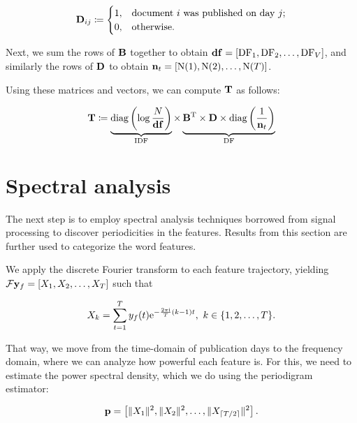\begin{equation}
	\mathbf{D}_{ij} \coloneqq
	\begin{cases}
		1, & \text{document}~i~\text{was published on day}~j \text{;} \\
		0, & \text{otherwise}.
	\end{cases}
\end{equation}

Next, we sum the rows of $\mathbf{B}$ together to obtain $\vect{\df} = \left[ \text{\df}_{1}, \text{\df}_{2}, \dots, \text{\df}_{\featcount} \right]$, and similarly the rows of $\mathbf{D}$ to obtain $\vect{\doccount}_{t} = \left[ \text{\doccount}(1), \text{\doccount}(2), \dots, \text{\doccount}(\streamlen) \right]$.

Using these matrices and vectors, we can compute $\mathbf{T}$ as follows:

\begin{equation}
	\trajmat \coloneqq
		\underbrace{\text{diag} \left( \log{\frac{\doccount}{\vect{\df}}} \right)}_{\text{IDF}}
		\times
		\underbrace{\bowmat^{\T}
		\times \dtdmat
		\times \text{diag} \left( \frac{1}{\vect{\doccount}_{t}} \right)}_{\text{DF}}
\end{equation}


\section{Spectral analysis}
The next step is to employ spectral analysis techniques borrowed from signal processing to discover periodicities in the features. Results from this section are further used to categorize the word features.

We apply the discrete Fourier transform to each feature trajectory, yielding $\mathcal{F} \vect{\traj}_{f} = \left[ X_{1}, X_{2}, \dots, X_{\streamlen}\right ]$ such that

\begin{equation*}
	X_{k} = \sum_{t = 1}^{T}{y_{f}(t) \mathrm{e}^{- \frac{2 \pi \mathrm{i}}{T} (k - 1) t}}, ~ k \in \{1, 2, \dots, T\}.
\end{equation*}

That way, we move from the time-domain of publication days to the frequency domain, where we can analyze how powerful each feature is. For this, we need to estimate the power spectral density, which we do using the periodigram estimator:

\begin{equation*}
	\vect{P} = \left[ \|X_{1}\|^{2}, \|X_{2}\|^{2}, \dots, \|X_{\ceil{\streamlen / 2}}\|^{2} \right].
\end{equation*}

